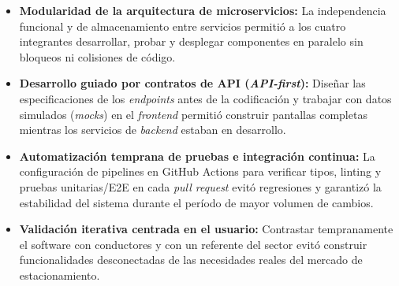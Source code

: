 \begin{itemize}
    \item \textbf{Modularidad de la arquitectura de microservicios:} La independencia funcional y de almacenamiento entre servicios permitió a los cuatro integrantes desarrollar, probar y desplegar componentes en paralelo sin bloqueos ni colisiones de código.
    \item \textbf{Desarrollo guiado por contratos de API (\textit{API-first}):} Diseñar las especificaciones de los \textit{endpoints} antes de la codificación y trabajar con datos simulados (\textit{mocks}) en el \textit{frontend} permitió construir pantallas completas mientras los servicios de \textit{backend} estaban en desarrollo.
    \item \textbf{Automatización temprana de pruebas e integración continua:} La configuración de pipelines en GitHub Actions para verificar tipos, linting y pruebas unitarias/E2E en cada \textit{pull request} evitó regresiones y garantizó la estabilidad del sistema durante el período de mayor volumen de cambios.
    \item \textbf{Validación iterativa centrada en el usuario:} Contrastar tempranamente el software con conductores y con un referente del sector evitó construir funcionalidades desconectadas de las necesidades reales del mercado de estacionamiento.
\end{itemize}
